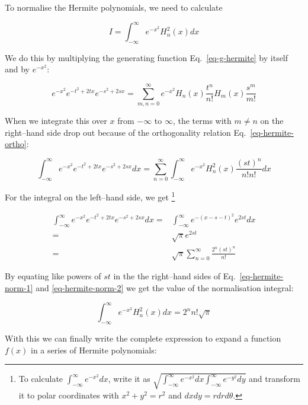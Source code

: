 To normalise the Hermite polynomials, we need to calculate

\begin{equation}
I = \int_{-\infty}^{\infty}e^{-x^2}H_n^2(x)dx
\end{equation}

We do this by multiplying the generating function Eq.~\ref{eq-g-hermite} by itself and by  $e^{-x^2}$:

\begin{equation}
e^{-x^2} e^{-t^2 + 2tx} e^{-s^2 + 2sx}= \sum_{m, n = 0}^{\infty}e^{-x^2} H_n(x)\frac{t^n}{n!}H_m(x)\frac{s^m}{m!}
\end{equation} 

When we integrate this over $x$ from $-\infty$ to $\infty$, the terms with $m \ne n$ on the right--hand side drop out because of the orthogonality relation Eq.~\ref{eq-hermite-ortho}:

\begin{equation}
\int_{-\infty}^{\infty} e^{-x^2} e^{-t^2 + 2tx} e^{-s^2 + 2sx} dx= \sum_{n = 0}^{\infty} \int_{-\infty}^{\infty} e^{-x^2} H_n^2(x)\frac{(st)^n}{n!n!} dx \label{eq-hermite-norm-1}
\end{equation} 

For the integral on the left--hand side, we get \footnote{To calculate $\int_{-\infty}^{\infty}e^{-x^2}dx$, write it as $\sqrt{\int_{-\infty}^{\infty} e^{-x^2}dx\int_{-\infty}^{\infty} e^{-y^2}dy}$ and transform it to polar coordinates with $x^2+y^2=r^2$ and $dxdy = r dr d\theta$.}

\begin{align}
\int_{-\infty}^{\infty} e^{-x^2} e^{-t^2 + 2tx} e^{-s^2 + 2sx} dx 
  = & \int_{-\infty}^{\infty} e^{-(x-s-t)^2} e^{2st}dx \nonumber \\
  = & \sqrt{\pi} e^{2st} \nonumber \\
  = & \sqrt{\pi} \sum_{n = 0}^{\infty} \frac{2^n{(st)}^n}{n!}  \label{eq-hermite-norm-2}
\end{align} 

By equating like powers of $st$ in the the right--hand sides of Eq.~\ref{eq-hermite-norm-1} and \ref{eq-hermite-norm-2} we get the value of the normalisation integral:

\begin{equation}
\int_{-\infty}^{\infty} e^{-x^2} H_n^2(x) dx = 2^n n! \sqrt{\pi}
\end{equation} 

With this we can finally write the complete expression to expand a function $f(x)$ in a series of Hermite polynomials:

